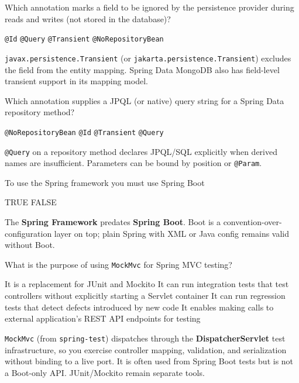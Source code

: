 \question[4]
Which annotation marks a field to be ignored by the persistence provider during reads and writes (not stored in the database)?
\begin{choices}
  \choice \texttt{@Id}
  \choice \texttt{@Query}
  \CorrectChoice \texttt{@Transient}
  \choice \texttt{@NoRepositoryBean}
\end{choices}
\begin{solution}
  \texttt{javax.persistence.Transient} (or \texttt{jakarta.persistence.Transient}) excludes the field from the entity mapping. Spring Data MongoDB also has field-level transient support in its mapping model.
\end{solution}

\question[4]
Which annotation supplies a JPQL (or native) query string for a Spring Data repository method?
\begin{choices}
  \choice \texttt{@NoRepositoryBean}
  \choice \texttt{@Id}
  \choice \texttt{@Transient}
  \CorrectChoice \texttt{@Query}
\end{choices}
\begin{solution}
  \texttt{@Query} on a repository method declares JPQL/SQL explicitly when derived names are insufficient. Parameters can be bound by position or \texttt{@Param}.
\end{solution}

\question[4]
To use the Spring framework you must use Spring Boot
\begin{choices}
  \choice TRUE
  \CorrectChoice FALSE
\end{choices}
\begin{solution}
  The \textbf{Spring Framework} predates \textbf{Spring Boot}. Boot is a convention-over-configuration layer on top; plain Spring with XML or Java config remains valid without Boot.
\end{solution}

\question[4]
What is the purpose of using \texttt{MockMvc} for Spring MVC testing?
\begin{choices}
  \choice It is a replacement for JUnit and Mockito
  \CorrectChoice It can run integration tests that test controllers without explicitly starting a Servlet container
  \choice It can run regression tests that detect defects introduced by new code
  \choice It enables making calls to external application's REST API endpoints for testing
\end{choices}
\begin{solution}
  \texttt{MockMvc} (from \texttt{spring-test}) dispatches through the \textbf{DispatcherServlet} test infrastructure, so you exercise controller mapping, validation, and serialization without binding to a live port. It is often used from Spring Boot tests but is not a Boot-only API. JUnit/Mockito remain separate tools.
\end{solution}

